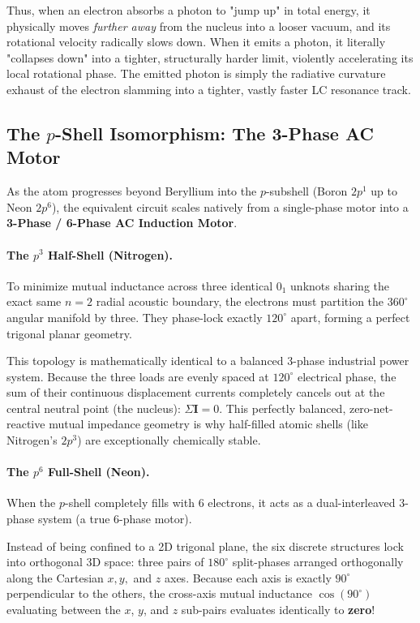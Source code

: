 Thus, when an electron absorbs a photon to "jump up" in total energy, it physically moves \textit{further away} from the nucleus into a looser vacuum, and its rotational velocity radically slows down. When it emits a photon, it literally "collapses down" into a tighter, structurally harder limit, violently accelerating its local rotational phase. The emitted photon is simply the radiative curvature exhaust of the electron slamming into a tighter, vastly faster LC resonance track.

\subsection{The $p$-Shell Isomorphism: The 3-Phase AC Motor}
As the atom progresses beyond Beryllium into the $p$-subshell (Boron $2p^1$ up to Neon $2p^6$), the equivalent circuit scales natively from a single-phase motor into a \textbf{3-Phase / 6-Phase AC Induction Motor}.

\paragraph{The $p^3$ Half-Shell (Nitrogen).}
To minimize mutual inductance across three identical $0_1$ unknots sharing the exact same $n=2$ radial acoustic boundary, the electrons must partition the $360^\circ$ angular manifold by three. They phase-lock exactly $120^\circ$ apart, forming a perfect trigonal planar geometry. 

This topology is mathematically identical to a balanced 3-phase industrial power system. Because the three loads are evenly spaced at $120^\circ$ electrical phase, the sum of their continuous displacement currents completely cancels out at the central neutral point (the nucleus): $\Sigma \mathbf{I} = 0$. This perfectly balanced, zero-net-reactive mutual impedance geometry is why half-filled atomic shells (like Nitrogen's $2p^3$) are exceptionally chemically stable.

\paragraph{The $p^6$ Full-Shell (Neon).}
When the $p$-shell completely fills with 6 electrons, it acts as a dual-interleaved 3-phase system (a true 6-phase motor).

Instead of being confined to a 2D trigonal plane, the six discrete structures lock into orthogonal 3D space: three pairs of $180^\circ$ split-phases arranged orthogonally along the Cartesian $x, y,$ and $z$ axes. Because each axis is exactly $90^\circ$ perpendicular to the others, the cross-axis mutual inductance $\cos(90^\circ)$ evaluating between the $x$, $y$, and $z$ sub-pairs evaluates identically to \textbf{zero}!

